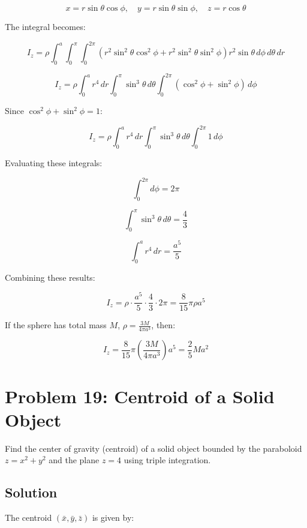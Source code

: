\documentclass{article}
\begin{document}
\[
x = r \sin \theta \cos \phi, \quad y = r \sin \theta \sin \phi, \quad z = r \cos \theta
\]



The integral becomes:


\[
I_z = \rho \int_{0}^{a} \int_{0}^{\pi} \int_{0}^{2\pi} (r^2 \sin^2 \theta \cos^2 \phi + r^2 \sin^2 \theta \sin^2 \phi) r^2 \sin \theta \, d\phi \, d\theta \, dr
\]




\[
I_z = \rho \int_{0}^{a} r^4 \, dr \int_{0}^{\pi} \sin^3 \theta \, d\theta \int_{0}^{2\pi} (\cos^2 \phi + \sin^2 \phi) \, d\phi
\]



Since \(\cos^2 \phi + \sin^2 \phi = 1\):


\[
I_z = \rho \int_{0}^{a} r^4 \, dr \int_{0}^{\pi} \sin^3 \theta \, d\theta \int_{0}^{2\pi} 1 \, d\phi
\]



Evaluating these integrals:


\[
\int_{0}^{2\pi} d\phi = 2\pi
\]




\[
\int_{0}^{\pi} \sin^3 \theta \, d\theta = \frac{4}{3}
\]




\[
\int_{0}^{a} r^4 \, dr = \frac{a^5}{5}
\]



Combining these results:


\[
I_z = \rho \cdot \frac{a^5}{5} \cdot \frac{4}{3} \cdot 2\pi = \frac{8}{15} \pi \rho a^5
\]



If the sphere has total mass \(M\), \(\rho = \frac{3M}{4\pi a^3}\), then:


\[
I_z = \frac{8}{15} \pi \left( \frac{3M}{4\pi a^3} \right) a^5 = \frac{2}{5} Ma^2
\]



\section*{Problem 19: Centroid of a Solid Object}
Find the center of gravity (centroid) of a solid object bounded by the paraboloid \(z = x^2 + y^2\) and the plane \(z = 4\) using triple integration.

\subsection*{Solution}
The centroid \((\bar{x}, \bar{y}, \bar{z})\) is given by:
\end{document}
